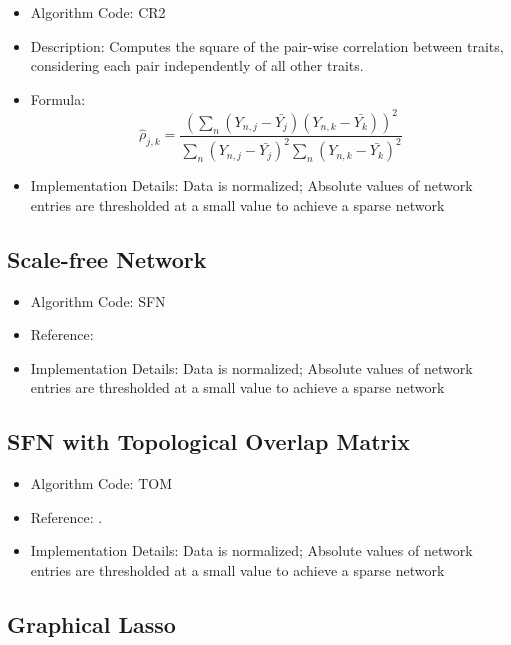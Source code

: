 \documentclass{article}
\begin{document}
\begin{itemize}
\item Algorithm Code: CR2
\item Description: Computes the square of the pair-wise correlation between traits, considering each pair independently of all other traits.
\item Formula:
\begin{equation*}
\hat{\rho}_{j,k} = \frac{(\sum_n (Y_{n,j} - \bar{Y_j})(Y_{n,k} - \bar{Y_k}))^2}{\sum_n (Y_{n,j} - \bar{Y_j})^2 \sum_n (Y_{n,k} - \bar{Y_k})^2}
\end{equation*}
\item Implementation Details: Data is normalized; Absolute values of network entries are thresholded at a small value to achieve a sparse network 
\end{itemize}

\subsection{Scale-free Network}

\begin{itemize}
\item Algorithm Code: SFN
\item Reference: \cite{SFN}
\item Implementation Details: Data is normalized; Absolute values of network entries are thresholded at a small value to achieve a sparse network   
\end{itemize}

\subsection{SFN with Topological Overlap Matrix}

\begin{itemize}
\item Algorithm Code: TOM
\item Reference: \cite{SFN}.
\item Implementation Details: Data is normalized; Absolute values of network entries are thresholded at a small value to achieve a sparse network   
\end{itemize}

\subsection{Graphical Lasso}
\end{document}
